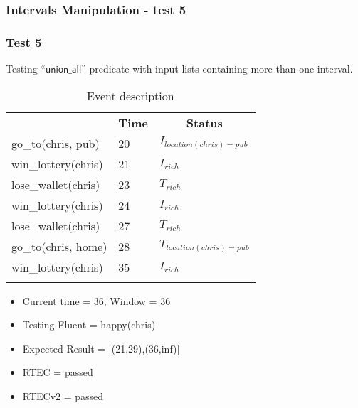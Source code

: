 \documentclass[8pt]{beamer}
\def \patsize {}
\def\unionall{\textsf{\patsize union\_all}}
\begin{document}
\begin{frame}
    \frametitle{Intervals Manipulation - test 5}
    \subsubsection{Test 5}
    \small Testing ``$\unionall$'' predicate with input lists containing more than one interval.\linebreak
    \begin{minipage}{0.48\linewidth}
        \begin{table}[t!]
            \caption{Event description}
            \begin{center}

                \begin{tabular}{lll}
                    \hline\noalign{\smallskip}
                    \multicolumn{1}{l}{\textbf{Event}} & \multicolumn{1}{c}{\textbf{Time}} & \multicolumn{1}{c}{\textbf{Status}}  \\
                    go\_to(chris, pub)& 20 & $I_{location(chris)=pub}$\\
                    win\_lottery(chris)&21 &$I_{rich}$\\
                    lose\_wallet(chris)& 23 &$T_{rich}$\\
                    win\_lottery(chris)& 24 &$I_{rich}$\\
                    lose\_wallet(chris)& 27 &$T_{rich}$\\
                    go\_to(chris, home)& 28 &$T_{location(chris)=pub}$\\
                    win\_lottery(chris)& 35&$I_{rich}$\\
                    \noalign{\smallskip}
                    \hline
                \end{tabular}
            \end{center}
        \end{table}

        \begin{itemize}
            \item Current time = 36, Window = 36
            \item Testing Fluent = happy(chris)
            \item Expected Result = [(21,29),(36,inf)]
            \item RTEC = passed
            \item RTECv2 = passed
        \end{itemize}
    \end{minipage}
    \begin{minipage}{0.48\linewidth}


\end{minipage}
\end{frame}
\end{document}
